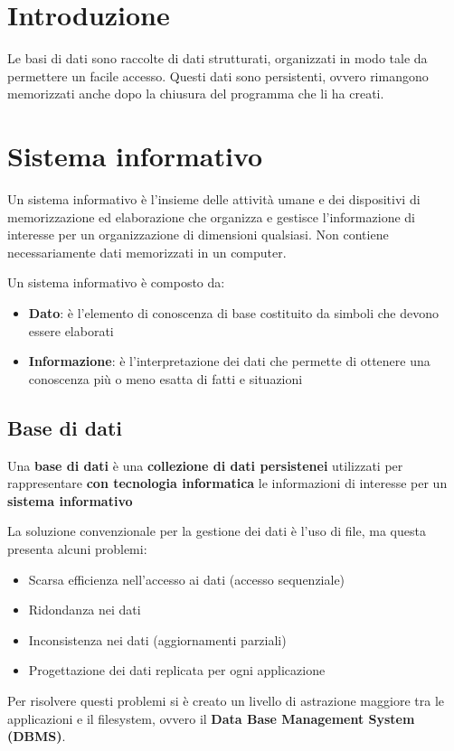 \documentclass[a4paper,twoside]{article}
\begin{document}


\tableofcontents
\pagebreak

\section{Introduzione}
Le basi di dati sono raccolte di dati strutturati, organizzati in modo tale da permettere
un facile accesso. Questi dati sono persistenti, ovvero rimangono memorizzati anche dopo
la chiusura del programma che li ha creati.

\section{Sistema informativo}
Un sistema informativo è l'insieme delle attività umane e dei dispositivi di memorizzazione
ed elaborazione che organizza e gestisce l'informazione di interesse per un organizzazione
di dimensioni qualsiasi. Non contiene necessariamente dati memorizzati in un computer.

Un sistema informativo è composto da:
\begin{itemize}
  \item \textbf{Dato}: è l'elemento di conoscenza di base costituito da simboli che devono
    essere elaborati
  \item \textbf{Informazione}: è l'interpretazione dei dati che permette di ottenere una
    conoscenza più o meno esatta di fatti e situazioni
\end{itemize}


\subsection{Base di dati}
\begin{definition}
  Una \textbf{base di dati} è una \textbf{collezione di dati persistenei} utilizzati per
  rappresentare \textbf{con tecnologia informatica} le informazioni di interesse per un
  \textbf{sistema informativo}
\end{definition}
La soluzione convenzionale per la gestione dei dati è l'uso di file, ma questa presenta
alcuni problemi:
\begin{itemize}
  \item Scarsa efficienza nell'accesso ai dati (accesso sequenziale)
  \item Ridondanza nei dati
  \item Inconsistenza nei dati (aggiornamenti parziali)
  \item Progettazione dei dati replicata per ogni applicazione
\end{itemize}
Per risolvere questi problemi si è creato un livello di astrazione maggiore tra le
applicazioni e il filesystem, ovvero il \textbf{Data Base Management System (DBMS)}.
\end{document}
